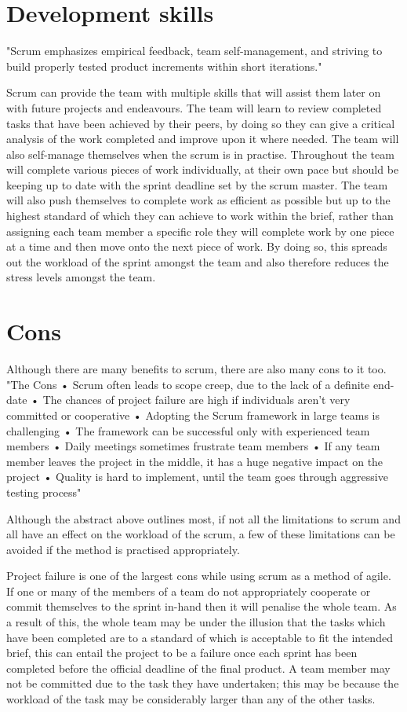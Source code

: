 \documentclass{scrartcl}
\begin{document}
\section{Development skills}
"Scrum emphasizes empirical feedback, team self-management, and striving to build properly tested product increments within short iterations." \cite{agilemethodologyrss}

Scrum can provide the team with multiple skills that will assist them later on with future projects and endeavours. The team will learn to review completed tasks that have been achieved by their peers, by doing so they can give a critical analysis of the work completed and improve upon it where needed. The team will also self-manage themselves when the scrum is in practise. Throughout the team will complete various pieces of work individually, at their own pace but should be keeping up to date with the sprint deadline set by the scrum master. The team will also push themselves to complete work as efficient as possible but up to the highest standard of which they can achieve to work within the brief, rather than assigning each team member a specific role they will complete work by one piece at a time and then move onto the next piece of work. By doing so, this spreads out the workload of the sprint amongst the team and also therefore reduces the stress levels amongst the team.

\section{Cons}
Although there are many benefits to scrum, there are also many cons to it too. 
"The Cons
•	Scrum often leads to scope creep, due to the lack of a definite end-date
•	The chances of project failure are high if individuals aren't very committed or cooperative
•	Adopting the Scrum framework in large teams is challenging
•	The framework can be successful only with experienced team members
•	Daily meetings sometimes frustrate team members
•	If any team member leaves the project in the middle, it has a huge negative impact on the project
•	Quality is hard to implement, until the team goes through aggressive testing process" \cite{2017}

Although the abstract above outlines most, if not all the limitations to scrum and all have an effect on the workload of the scrum, a few of these limitations can be avoided if the method is practised appropriately.

Project failure is one of the largest cons while using scrum as a method of agile. If one or many of the members of a team do not appropriately cooperate or commit themselves to the sprint in-hand then it will penalise the whole team. As a result of this, the whole team may be under the illusion that the tasks which have been completed are to a standard of which is acceptable to fit the intended brief, this can entail the project to be a failure once each sprint has been completed before the official deadline of the final product. A team member may not be committed due to the task they have undertaken; this may be because the workload of the task may be considerably larger than any of the other tasks.
 
\end{document}
